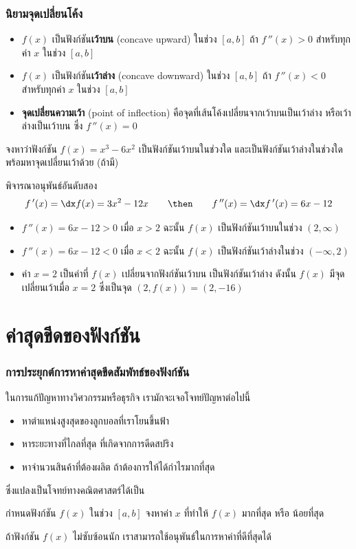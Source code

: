 \begin{frame}
\frametitle{นิยามจุดเปลี่ยนโค้ง}
\begin{defn}{}{}
\begin{itemize}
\item $f(x)$ เป็นฟังก์ชัน\textbf{เว้าบน} (concave upward) ในช่วง $[a,b]$ ถ้า $f\,''(x) > 0$ สำหรับทุกค่า $x$ ในช่วง $[a,b]$
\item $f(x)$ เป็นฟังก์ชัน\textbf{เว้าล่าง} (concave downward) ในช่วง $[a,b]$ ถ้า $f\,''(x) < 0$ สำหรับทุกค่า $x$ ในช่วง $[a,b]$
\item \textbf{จุดเปลี่ยนความเว้า} (point of inflection) คือจุดที่เส้นโค้งเปลี่ยนจากเว้าบนเป็นเว้าล่าง หรือเว้าล่างเป็นเว้าบน ซึ่ง $f\,''(x) = 0$
\end{itemize}
\end{defn}
\end{frame}


\begin{frame}[t]
\begin{ex}
จงหาว่าฟังก์ชัน $f(x) = x^3-6x^2$ เป็นฟังก์ชันเว้าบนในช่วงใด และเป็นฟังก์ชันเว้าล่างในช่วงใด พร้อมหาจุดเปลี่ยนเว้าด้วย (ถ้ามี)
\end{ex}
\begin{sol}
พิจารณาอนุพันธ์อันดับสอง 
\[ f\,'(x) = \dx f(x) = 3x^2 - 12x \qquad \then \qquad f\,''(x) = \dx f\,'(x) = 6x - 12 \]
\begin{itemize}
\item $f\,''(x) = 6x-12 > 0$ เมื่อ $x > 2$ ฉะนั้น $f(x)$ เป็นฟังก์ชันเว้าบนในช่วง $(2, \infty)$
\item $f\,''(x) = 6x-12 < 0$ เมื่อ $x < 2$ ฉะนั้น $f(x)$ เป็นฟังก์ชันเว้าล่างในช่วง $(-\infty, 2)$
\item ค่า $x=2$ เป็นค่าที่ $f(x)$ เปลี่ยนจากฟังก์ชันเว้าบน เป็นฟังก์ชันเว้าล่าง ดังนั้น $f(x)$ มีจุดเปลี่ยนเว้าเมื่อ $x=2$ ซึ่งเป็นจุด $(2, f(x)) = (2, -16)$
\end{itemize}
\end{sol}
\end{frame}

\section[ค่าสุดขีด]{ค่าสุดขีดของฟังก์ชัน}
\frame{\sectionpage}

\begin{frame}
\frametitle{การประยุกต์การหาค่าสุดขีดสัมพัทธ์ของฟังก์ชัน}
ในการแก้ปัญหาทางวิศวกรรมหรือธุรกิจ เรามักจะเจอโจทย์ปัญหาต่อไปนี้
\begin{itemize}
\item หาตำแหน่งสูงสุดของลูกบอลที่เราโยนขึ้นฟ้า
\item หาระยะทางที่ไกลที่สุด ที่เกิดจากการดีดสปริง
\item หาจำนวนสินค้าที่ต้องผลิต ถ้าต้องการให้ได้กำไรมากที่สุด
\end{itemize}
ซึ่งแปลงเป็นโจทย์ทางคณิตศาสตร์ได้เป็น
\begin{block}{}
กำหนดฟังก์ชัน $f(x)$ ในช่วง $[a,b]$ จงหาค่า $x$ ที่ทำให้ $f(x)$ มากที่สุด หรือ น้อยที่สุด
\end{block}
ถ้าฟังก์ชัน $f(x)$ ไม่ซับซ้อนนัก เราสามารถใช้อนุพันธ์ในการหาค่าที่ดีที่สุดได้
\end{frame}

